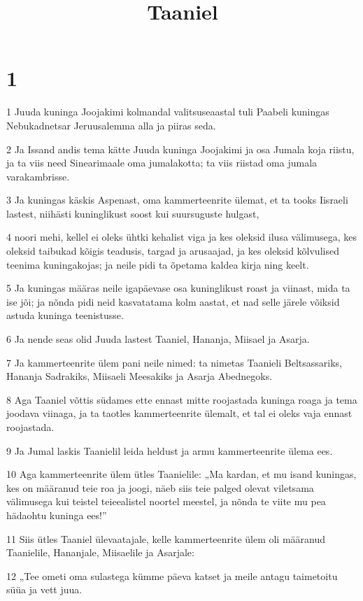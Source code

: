 

\title{Taaniel}

\chapter{1}

\par 1 Juuda kuninga Joojakimi kolmandal valitsuseaastal tuli Paabeli kuningas Nebukadnetsar Jeruusalemma alla ja piiras seda.
\par 2 Ja Issand andis tema kätte Juuda kuninga Joojakimi ja osa Jumala koja riistu, ja ta viis need Sinearimaale oma jumalakotta; ta viis riistad oma jumala varakambrisse.
\par 3 Ja kuningas käskis Aspenast, oma kammerteenrite ülemat, et ta tooks Iisraeli lastest, niihästi kuninglikust soost kui suursuguste hulgast,
\par 4 noori mehi, kellel ei oleks ühtki kehalist viga ja kes oleksid ilusa välimusega, kes oleksid taibukad kõigis teadusis, targad ja arusaajad, ja kes oleksid kõlvulised teenima kuningakojas; ja neile pidi ta õpetama kaldea kirja ning keelt.
\par 5 Ja kuningas määras neile igapäevase osa kuninglikust roast ja viinast, mida ta ise jõi; ja nõnda pidi neid kasvatatama kolm aastat, et nad selle järele võiksid astuda kuninga teenistusse.
\par 6 Ja nende seas olid Juuda lastest Taaniel, Hananja, Miisael ja Asarja.
\par 7 Ja kammerteenrite ülem pani neile nimed: ta nimetas Taanieli Beltsassariks, Hananja Sadrakiks, Miisaeli Meesakiks ja Asarja Abednegoks.
\par 8 Aga Taaniel võttis südames ette ennast mitte roojastada kuninga roaga ja tema joodava viinaga, ja ta taotles kammerteenrite ülemalt, et tal ei oleks vaja ennast roojastada.
\par 9 Ja Jumal laskis Taanielil leida heldust ja armu kammerteenrite ülema ees.
\par 10 Aga kammerteenrite ülem ütles Taanielile: „Ma kardan, et mu isand kuningas, kes on määranud teie roa ja joogi, näeb siis teie palged olevat viletsama välimusega kui teistel teieealistel noortel meestel, ja nõnda te viite mu pea hädaohtu kuninga ees!”
\par 11 Siis ütles Taaniel ülevaatajale, kelle kammerteenrite ülem oli määranud Taanielile, Hananjale, Miisaelile ja Asarjale:
\par 12 „Tee ometi oma sulastega kümme päeva katset ja meile antagu taimetoitu süüa ja vett juua.
